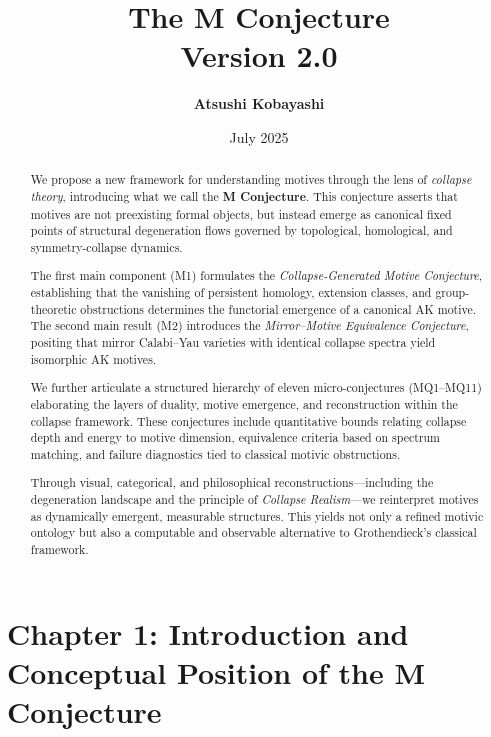 \documentclass[11pt]{article}
\title{\textbf{The M Conjecture} \\ \Large Version 2.0}
\author{\textbf{Atsushi Kobayashi} \quad {\small (with ChatGPT Research Partner)}}
\date{July 2025}
\begin{document}
\maketitle
\tableofcontents
\newpage



\begin{abstract}
We propose a new framework for understanding motives through the lens of \emph{collapse theory}, introducing what we call the \textbf{M Conjecture}. This conjecture asserts that motives are not preexisting formal objects, but instead emerge as canonical fixed points of structural degeneration flows governed by topological, homological, and symmetry-collapse dynamics. 

The first main component (M1) formulates the \emph{Collapse-Generated Motive Conjecture}, establishing that the vanishing of persistent homology, extension classes, and group-theoretic obstructions determines the functorial emergence of a canonical AK motive. The second main result (M2) introduces the \emph{Mirror–Motive Equivalence Conjecture}, positing that mirror Calabi–Yau varieties with identical collapse spectra yield isomorphic AK motives.

We further articulate a structured hierarchy of eleven micro-conjectures (MQ1–MQ11) elaborating the layers of duality, motive emergence, and reconstruction within the collapse framework. These conjectures include quantitative bounds relating collapse depth and energy to motive dimension, equivalence criteria based on spectrum matching, and failure diagnostics tied to classical motivic obstructions.

Through visual, categorical, and philosophical reconstructions—including the degeneration landscape and the principle of \emph{Collapse Realism}—we reinterpret motives as dynamically emergent, measurable structures. This yields not only a refined motivic ontology but also a computable and observable alternative to Grothendieck’s classical framework.

\end{abstract}




\section{Chapter 1: Introduction and Conceptual Position of the M Conjecture}
\end{document}
